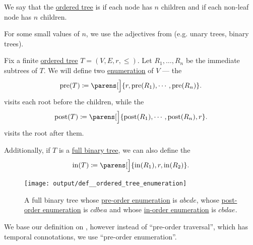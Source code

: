 \begin{definition}\label{def:n_ary_tree}
  We say that the \hyperref[def:ordered_tree]{ordered tree} is  if each node has  \( n \) children and  if each non-leaf node has  \( n \) children.

  For some small values of \( n \), we use the adjectives from  (e.g. unary trees, binary trees).
\end{definition}

\begin{definition}\label{def:ordered_tree_enumeration}
  Fix a finite \hyperref[def:ordered_tree]{ordered tree} \( T = (V, E, r, \leq) \). Let \( R_1, \ldots, R_n \) be the immediate subtrees of \( T \). We will define two \hyperref[def:enumeration]{enumeration} of \( V \) --- the 
  \begin{equation}\label{eq:def:ordered_tree_enumeration/pre}
    \op{pre}(T) \coloneqq \parens[\Big]{ r, \op{pre}(R_1), \cdots, \op{pre}(R_n) }.
  \end{equation}
  visits each root before the children, while the 
  \begin{equation}\label{eq:def:ordered_tree_enumeration/post}
    \op{post}(T) \coloneqq \parens[\Big]{ \op{post}(R_1), \cdots, \op{post}(R_n), r }.
  \end{equation}
  visits the root after them.

  Additionally, if \( T \) is a \hyperref[def:n_ary_tree]{full binary tree}, we can also define the 
  \begin{equation}\label{eq:def:ordered_tree_enumeration/in}
    \op{in}(T) \coloneqq \parens[\Big]{ \op{in}(R_1), r, \op{in}(R_2) }.
  \end{equation}

  \begin{figure}[!ht]
    \centering
    \texttt{[image: output/def\_\_ordered\_tree\_enumeration]}
    \caption{A full binary tree whose \hyperref[eq:def:ordered_tree_enumeration/pre]{pre-order enumeration} is \( abcde \), whose \hyperref[eq:def:ordered_tree_enumeration/post]{post-order enumeration} is \( cdbea \) and whose \hyperref[eq:def:ordered_tree_enumeration/in]{in-order enumeration} is \( cbdae \).}
    \label{fig:def:ordered_tree_enumeration}
  \end{figure}
\end{definition}
\begin{comments}
  \item We base our definition on \cite[228]{Erickson2019Algorithms}, however instead of \enquote{pre-order traversal}, which has temporal connotations, we use \enquote{pre-order enumeration}.
\end{comments}

